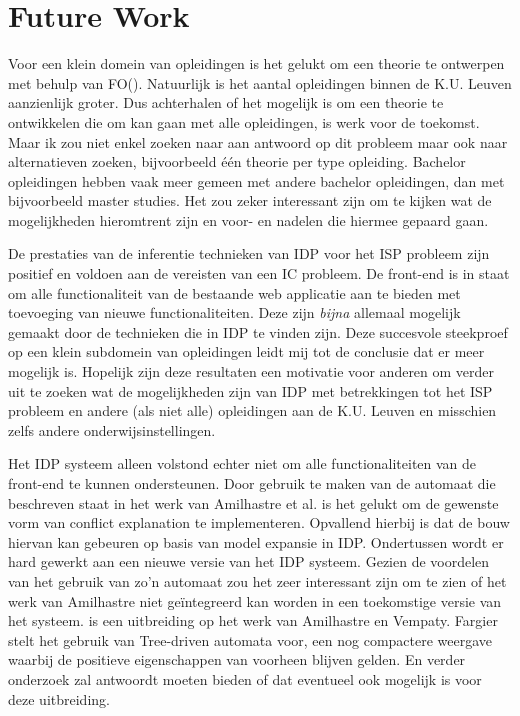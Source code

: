 \chapter{Future Work}
\label{cha:futurework}
Voor een klein domein van opleidingen is het gelukt om een theorie te ontwerpen met behulp van FO(\textperiodcentered). Natuurlijk is het aantal opleidingen binnen de K.U. Leuven aanzienlijk groter. Dus achterhalen of het mogelijk is om een theorie te ontwikkelen die om kan gaan met alle opleidingen, is werk voor de toekomst. Maar ik zou niet enkel zoeken naar aan antwoord op dit probleem maar ook naar alternatieven zoeken, bijvoorbeeld \'{e}\'{e}n theorie per type opleiding. Bachelor opleidingen hebben vaak meer gemeen met andere bachelor opleidingen, dan met bijvoorbeeld master studies. Het zou zeker interessant zijn om te kijken wat de mogelijkheden hieromtrent zijn en voor- en nadelen die hiermee gepaard gaan. 

De prestaties van de inferentie technieken van IDP voor het ISP probleem zijn positief en voldoen aan de vereisten van een IC probleem. De front-end is in staat om alle functionaliteit van de bestaande web applicatie aan te bieden met toevoeging van nieuwe functionaliteiten. Deze zijn \textit{bijna} allemaal mogelijk gemaakt door de technieken die in IDP te vinden zijn. Deze succesvole steekproef op een klein subdomein van opleidingen leidt mij tot de conclusie dat er meer mogelijk is. Hopelijk zijn deze resultaten een motivatie voor anderen om verder uit te zoeken wat de mogelijkheden zijn van IDP met betrekkingen tot het ISP probleem en andere (als niet alle) opleidingen aan de K.U. Leuven en misschien zelfs andere onderwijsinstellingen. 

Het IDP systeem alleen volstond echter niet om alle functionaliteiten van de front-end te kunnen ondersteunen. Door gebruik te maken van de automaat die beschreven staat in het werk van Amilhastre et al. is het gelukt om de gewenste vorm van conflict explanation te implementeren. Opvallend hierbij is dat de bouw hiervan kan gebeuren op basis van model expansie in IDP. Ondertussen wordt er hard gewerkt aan een nieuwe versie van het IDP systeem. Gezien de voordelen van het gebruik van zo'n automaat zou het zeer interessant zijn om te zien of het werk van Amilhastre niet ge\"{i}ntegreerd kan worden in een toekomstige versie van het systeem. \citep{fargier2004compiling} is een uitbreiding op het werk van Amilhastre en Vempaty. Fargier stelt het gebruik van Tree-driven automata voor, een nog compactere weergave waarbij de positieve eigenschappen van voorheen blijven gelden. En verder onderzoek zal antwoordt moeten bieden of dat eventueel ook mogelijk is voor deze uitbreiding. 